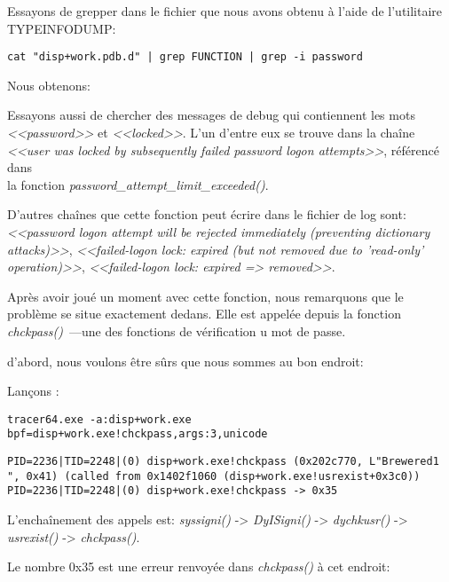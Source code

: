 Essayons de grepper dans le fichier que nous avons obtenu à l'aide de l'utilitaire
TYPEINFODUMP:

\begin{lstlisting}
cat "disp+work.pdb.d" | grep FUNCTION | grep -i password
\end{lstlisting}

Nous obtenons:



Essayons aussi de chercher des messages de debug qui contiennent les mots \emph{<<password>>}
et \emph{<<locked>>}.
L'un d'entre eux se trouve dans la chaîne \emph{<<user was locked by subsequently
failed password logon attempts>>}, référencé dans\\
la fonction \emph{password\_attempt\_limit\_exceeded()}.

D'autres chaînes que cette fonction peut écrire dans le fichier de log sont:
\emph{<<password logon attempt will be rejected immediately (preventing dictionary attacks)>>},
\emph{<<failed-logon lock: expired (but not removed due to 'read-only' operation)>>},
\emph{<<failed-logon lock: expired => removed>>}.

Après avoir joué un moment avec cette fonction, nous remarquons que le problème se
situe exactement dedans.
Elle est appelée depuis la fonction \emph{chckpass()}~---une des fonctions de vérification
u mot de passe.

d'abord, nous voulons être sûrs que nous sommes au bon endroit:

Lançons \tracer:

\begin{lstlisting}
tracer64.exe -a:disp+work.exe bpf=disp+work.exe!chckpass,args:3,unicode
\end{lstlisting}

\begin{lstlisting}
PID=2236|TID=2248|(0) disp+work.exe!chckpass (0x202c770, L"Brewered1                               ", 0x41) (called from 0x1402f1060 (disp+work.exe!usrexist+0x3c0))
PID=2236|TID=2248|(0) disp+work.exe!chckpass -> 0x35
\end{lstlisting}

L'enchaînement des appels est: \emph{syssigni()} -> \emph{DyISigni()} -> \emph{dychkusr()} -> \emph{usrexist()} -> \emph{chckpass()}.

Le nombre 0x35 est une erreur renvoyée dans \emph{chckpass()} à cet endroit:



